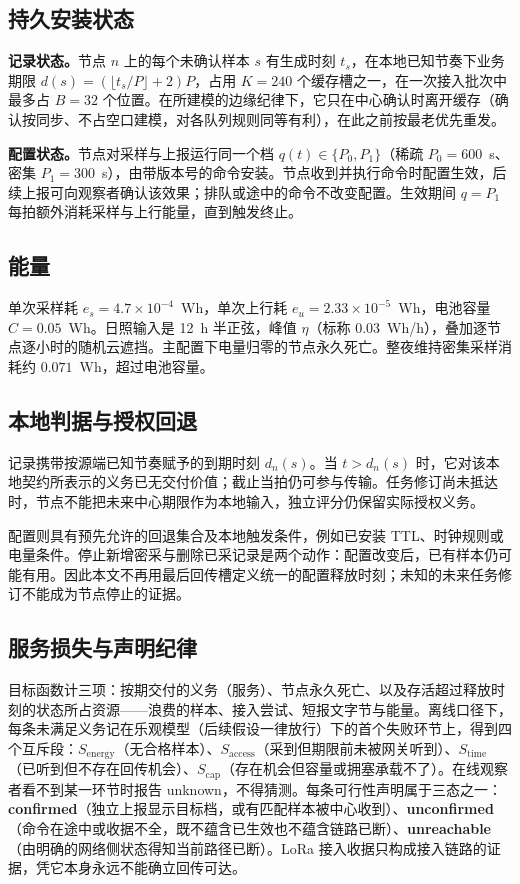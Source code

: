 \documentclass[11pt]{article}
\newcommand{\stime}{$S_{\mathrm{time}}$\xspace}
\newcommand{\scap}{$S_{\mathrm{cap}}$\xspace}
\newcommand{\senergy}{$S_{\mathrm{energy}}$\xspace}
\newcommand{\saccess}{$S_{\mathrm{access}}$\xspace}
\begin{document}
\subsection{持久安装状态}
\textbf{记录状态。}节点 $n$ 上的每个未确认样本 $s$ 有生成时刻 $t_s$，在本地已知节奏下业务期限 $d(s)=(\lfloor t_s/P\rfloor+2)P$，占用 $K{=}240$ 个缓存槽之一，在一次接入批次中最多占 $B{=}32$ 个位置。在所建模的边缘纪律下，它只在中心确认时离开缓存（确认按同步、不占空口建模，对各队列规则同等有利），在此之前按最老优先重发。

\textbf{配置状态。}节点对采样与上报运行同一个档 $q(t)\in\{P_0,P_1\}$（稀疏 $P_0{=}600$~s、密集 $P_1{=}300$~s），由带版本号的命令安装。节点收到并执行命令时配置生效，后续上报可向观察者确认该效果；排队或途中的命令不改变配置。生效期间 $q{=}P_1$ 每拍额外消耗采样与上行能量，直到触发终止。

\subsection{能量}
单次采样耗 $e_s{=}4.7{\times}10^{-4}$~Wh，单次上行耗 $e_u{=}2.33{\times}10^{-5}$~Wh，电池容量 $C{=}0.05$~Wh。日照输入是 12~h 半正弦，峰值 $\eta$（标称 $0.03$~Wh/h），叠加逐节点逐小时的随机云遮挡。主配置下电量归零的节点永久死亡。整夜维持密集采样消耗约 $0.071$~Wh，超过电池容量。

\subsection{本地判据与授权回退}
记录携带按源端已知节奏赋予的到期时刻 $d_n(s)$。当 $t>d_n(s)$ 时，它对该本地契约所表示的义务已无交付价值；截止当拍仍可参与传输。任务修订尚未抵达时，节点不能把未来中心期限作为本地输入，独立评分仍保留实际授权义务。

配置则具有预先允许的回退集合及本地触发条件，例如已安装 TTL、时钟规则或电量条件。停止新增密采与删除已采记录是两个动作：配置改变后，已有样本仍可能有用。因此本文不再用最后回传槽定义统一的配置释放时刻；未知的未来任务修订不能成为节点停止的证据。

\subsection{服务损失与声明纪律}
目标函数计三项：按期交付的义务（服务）、节点永久死亡、以及存活超过释放时刻的状态所占资源——浪费的样本、接入尝试、短报文字节与能量。离线口径下，每条未满足义务记在乐观模型（后续假设一律放行）下的首个失败环节上，得到四个互斥段：\senergy（无合格样本）、\saccess（采到但期限前未被网关听到）、\stime（已听到但不存在回传机会）、\scap（存在机会但容量或拥塞承载不了）。在线观察者看不到某一环节时报告 unknown，不得猜测。每条可行性声明属于三态之一：\textbf{confirmed}（独立上报显示目标档，或有匹配样本被中心收到）、\textbf{unconfirmed}（命令在途中或收据不全，既不蕴含已生效也不蕴含链路已断）、\textbf{unreachable}（由明确的网络侧状态得知当前路径已断）。LoRa 接入收据只构成接入链路的证据，凭它本身永远不能确立回传可达。
\end{document}
